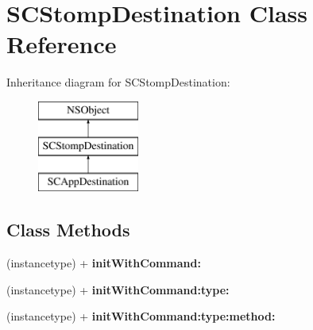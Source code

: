 \hypertarget{interface_s_c_stomp_destination}{}\section{S\+C\+Stomp\+Destination Class Reference}
\label{interface_s_c_stomp_destination}
Inheritance diagram for S\+C\+Stomp\+Destination\+:\begin{figure}[H]
\begin{center}
\leavevmode
\includegraphics[height=3.000000cm]{interface_s_c_stomp_destination}
\end{center}
\end{figure}
\subsection*{Class Methods}
\begin{DoxyCompactItemize}
\item 
(instancetype) + {\bfseries init\+With\+Command\+:}\hypertarget{interface_s_c_stomp_destination_aeaad4996fdc292a5735cbd2ad10c0be6}{}\label{interface_s_c_stomp_destination_aeaad4996fdc292a5735cbd2ad10c0be6}

\item 
(instancetype) + {\bfseries init\+With\+Command\+:type\+:}\hypertarget{interface_s_c_stomp_destination_a1edfe54457d7c65993d2ad25245f90e7}{}\label{interface_s_c_stomp_destination_a1edfe54457d7c65993d2ad25245f90e7}

\item 
(instancetype) + {\bfseries init\+With\+Command\+:type\+:method\+:}\hypertarget{interface_s_c_stomp_destination_a396c5c2a37b6f5df05dbce70ac38ce02}{}\label{interface_s_c_stomp_destination_a396c5c2a37b6f5df05dbce70ac38ce02}

\end{DoxyCompactItemize}

